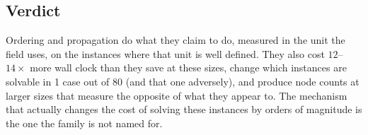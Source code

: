 \subsection{Verdict}

Ordering and propagation do what they claim to do, measured in the unit the field uses, on the
instances where that unit is well defined. They also cost $12$--$14\times$ more wall clock than they
save at these sizes, change which instances are solvable in 1 case out of 80 (and that one
adversely), and produce node counts at larger sizes that measure the opposite of what they appear
to. The mechanism that actually changes the cost of solving these instances by orders of magnitude
is the one the family is not named for.
